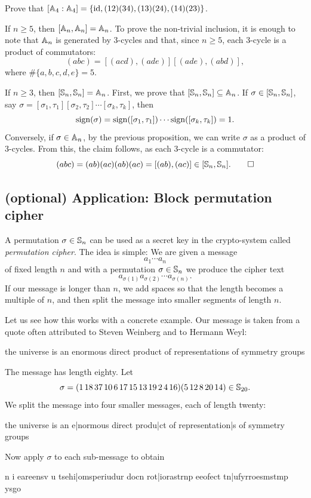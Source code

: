 \begin{exercise}
\label{xca:commutator_A4}
    Prove that $[\mathbb{A}_4:\mathbb{A}_4]=\{\operatorname{id},(12)(34),(13)(24),(14)(23)\}$. 
\end{exercise}

\begin{example}
If $n\geq5$, then $[\mathbb{A}_n,\mathbb{A}_n]=\mathbb{A}_n$. To prove the non-trivial
inclusion, it is enough to note that $\mathbb{A}_n$ is generated by 
3-cycles and that, since $n\geq5$, each 3-cycle 
is a product of commutators: 
\[
(abc)=[(acd),(ade)][(ade),(abd)],
\]
where $\#\{a,b,c,d,e\}=5$.
\end{example}

\begin{example}
If $n\geq3$, then $[\mathbb{S}_n,\mathbb{S}_n]=\mathbb{A}_n$. First, we prove that $[\mathbb{S}_n,\mathbb{S}_n]\subseteq\mathbb{A}_n$. If 
$\sigma\in[\mathbb{S}_n,\mathbb{S}_n]$,
say $\sigma=[\sigma_1,\tau_1][\sigma_2,\tau_2]\cdots[\sigma_k,\tau_k]$, then
\[
\operatorname{sign}(\sigma)=\operatorname{sign}([\sigma_1,\tau_1])\cdots\operatorname{sign}([\sigma_k,\tau_k])=1.
\]
Conversely, if $\sigma\in\mathbb{A}_n$, by the previous proposition, 
we can write $\sigma$ as a product of 3-cycles. 
From this, the claim follows, as each 3-cycle is a commutator: 
\[
(abc)=(ab)(ac)(ab)(ac)=[(ab),(ac)]\in[\mathbb{S}_n,\mathbb{S}_n].\qedhere
\]
\end{example}

\subsection{
(optional) Application: Block permutation cipher}
A permutation $\sigma\in\mathbb{S}_n$ can be used as a secret key in the crypto-system 
called \emph{permutation cipher}. The idea is simple: We are given a message
\[
a_1\cdots a_n
\]
of fixed length $n$ and with a permutation $\sigma\in\mathbb{S}_n$ 
we produce the cipher text 
\[
a_{\sigma(1)}a_{\sigma(2)}\cdots a_{\sigma(n)}.
\]
If our message is longer than  $n$, we add spaces so that the length becomes a multiple of $n$, 
and then split the message into smaller segments of length  $n$.

Let us see how this works with a concrete example. Our message is taken from a quote often attributed to  
Steven Weinberg and to  
Hermann Weyl:
\begin{center}
    \textsf{the universe is an enormous direct product of representations of symmetry groups}
\end{center}
The message has length eighty. 
Let 
\[
\sigma=(1\,18\,37\,10\,6\,17\,15\,13\,19\,2\,4\,16)(5\,12\,8\,20\,14)\in\mathbb{S}_{20}.
\]
We split the message into four smaller messages, each of length twenty:
\begin{center}
\textsf{the universe is an e|normous direct produ|ct of representation|s of symmetry groups}
\end{center}
Now apply $\sigma$ to each sub-message to obtain 
\begin{center}
\textsf{n i eareensv u tsehi|omsperiudur docn rot|iorastrnp eeofect tn|ufyrroesmstmp ysgo}
\end{center}
